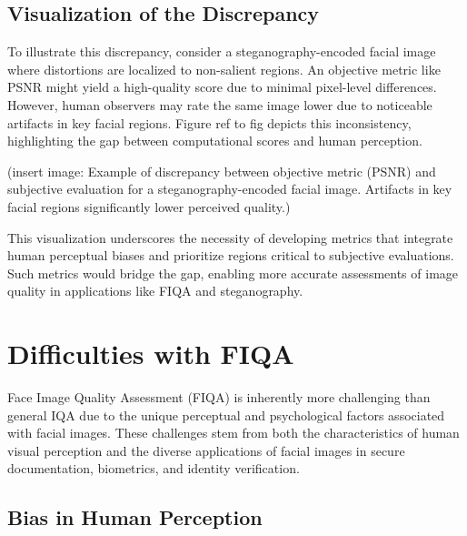 \subsection{Visualization of the Discrepancy}

To illustrate this discrepancy, consider a steganography-encoded facial image where distortions are localized to non-salient regions. An objective metric like PSNR might yield a high-quality score due to minimal pixel-level differences. However, human observers may rate the same image lower due to noticeable artifacts in key facial regions. Figure ref to fig depicts this inconsistency, highlighting the gap between computational scores and human perception.

(insert image: Example of discrepancy between objective metric (PSNR) and subjective evaluation for a steganography-encoded facial image. Artifacts in key facial regions significantly lower perceived quality.)

This visualization underscores the necessity of developing metrics that integrate human perceptual biases and prioritize regions critical to subjective evaluations. Such metrics would bridge the gap, enabling more accurate assessments of image quality in applications like FIQA and steganography.

\section{Difficulties with FIQA}

Face Image Quality Assessment (FIQA) is inherently more challenging than general IQA due to the unique perceptual and psychological factors associated with facial images. These challenges stem from both the characteristics of human visual perception and the diverse applications of facial images in secure documentation, biometrics, and identity verification.

\subsection{Bias in Human Perception}


